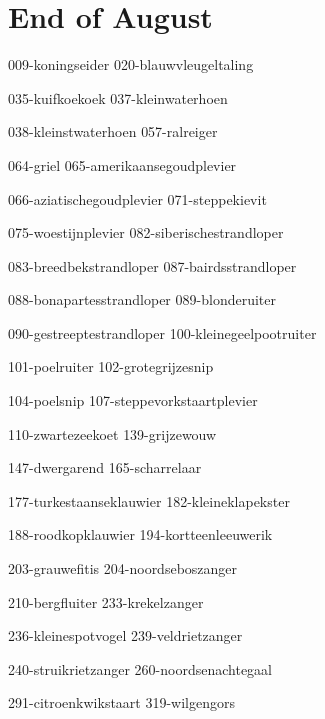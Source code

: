 \section{End of August}


\begin{figure*}[h!]
    \centering
    \subfig
    {009-koningseider}
    {020-blauwvleugeltaling}

    \subfig
    {035-kuifkoekoek}
    {037-kleinwaterhoen}

    \subfig
    {038-kleinstwaterhoen}
    {057-ralreiger}
    
    \subfig
    {064-griel}
    {065-amerikaansegoudplevier}

    \subfig
    {066-aziatischegoudplevier}
    {071-steppekievit}

    \subfig
    {075-woestijnplevier}
    {082-siberischestrandloper}
\end{figure*}


\begin{figure*}[h!]
    \centering
    \subfig
    {083-breedbekstrandloper}
    {087-bairdsstrandloper}

    \subfig
    {088-bonapartesstrandloper}
    {089-blonderuiter}

    \subfig
    {090-gestreeptestrandloper}
    {100-kleinegeelpootruiter}

    \subfig
    {101-poelruiter}
    {102-grotegrijzesnip}

    \subfig
    {104-poelsnip}
    {107-steppevorkstaartplevier}

    \subfig
    {110-zwartezeekoet}
    {139-grijzewouw}
\end{figure*}

\begin{figure*}[h!]
    \centering
    \subfig
    {147-dwergarend}
    {165-scharrelaar}

    \subfig
    {177-turkestaanseklauwier}
    {182-kleineklapekster}

    \subfig
    {188-roodkopklauwier}
    {194-kortteenleeuwerik}

    \subfig
    {203-grauwefitis}
    {204-noordseboszanger}

    \subfig
    {210-bergfluiter}
    {233-krekelzanger}

    \subfig
    {236-kleinespotvogel}
    {239-veldrietzanger}
\end{figure*}

\begin{figure*}[h!]
    \centering
    \subfig
    {240-struikrietzanger}
    {260-noordsenachtegaal}

    \subfig
    {291-citroenkwikstaart}
    {319-wilgengors}
\end{figure*}